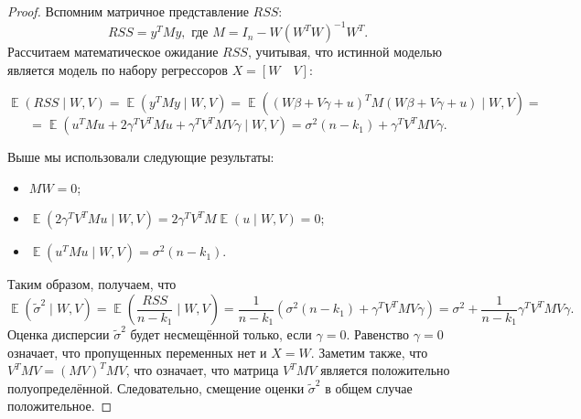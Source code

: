 \documentclass[12pt]{article}
\DeclareMathOperator{\Var}{\mathbb{V}ar}
\DeclareMathOperator{\E}{\mathbb{E}}
\renewcommand{\b}{\beta}
\newcommand{\hb}{\hat{\beta}}
\newcommand{\tb}{\tilde{\beta}}
\newcommand{\RSS}{RSS}
\begin{document}
\begin{proof}
Вспомним матричное представление $\RSS$:
\[
\RSS = y^{T}My, \text{ где } M = I_n - W(W^{T}W)^{-1}W^{T}.
\]
Рассчитаем математическое ожидание $\RSS$, учитывая, что истинной моделью является модель по набору регрессоров $X = [W \quad V]$:

\[
\E(\RSS \mid W,V) = \E(y^{T}My \mid W,V) = \E((W\b + V\gamma + u)^{T}M(W\b + V\gamma + u) \mid W,V) = 
\]
\[
=\E(u^{T}Mu + 2\gamma^{T}V^{T}Mu + \gamma^{T}V^{T}MV\gamma \mid W,V) = \sigma^2(n-k_1) + \gamma^{T}V^{T}MV\gamma.
\]

Выше мы использовали следующие результаты:
\begin{itemize}
    \item $MW = 0$;
    \item $\E(2\gamma^{T}V^{T}Mu \mid W,V) = 2\gamma^{T}V^{T}M\E(u \mid W,V) = 0$;
    \item  $\E (u^{T}Mu \mid W,V) = \sigma^2(n-k_1)$.
\end{itemize}

Таким образом, получаем, что 
\[
\E(\tilde\sigma^2 \mid W,V) = \E\left( \frac{RSS}{n-k_1}  \mid W,V\right) = \frac{1}{n-k_1} ( \sigma^2(n-k_1) + \gamma^{T}V^{T}MV\gamma ) = \sigma^2 + \frac{1}{n - k_1} \gamma^{T}V^{T}MV\gamma.
\]
Оценка дисперсии $\tilde\sigma^2$ будет несмещённой только, если $\gamma = 0$. 
Равенство $\gamma = 0$ означает, что пропущенных переменных нет и $X = W$.
Заметим также, что $V^{T}MV = (MV)^{T}MV$, что означает, что матрица $V^{T}MV$ является положительно полуопределённой. 
Следовательно, смещение оценки $\tilde\sigma^2$ в общем случае положительное.
\end{proof}
\begin{comment}
Что будет с эффективностью оценок, если пропущена часть важных регрессоров?
Ковариационная матрица оценок коэффициентов $\tilde{\b}$, полученная по сокращенному набору регрессоров $W$, имеет вид:
\[
\Var(\hb) = \sigma^2(X^{T}X)^{-1}.
\]

Вычислим ковариационную матрицу оценок коэффициентов $[\beta \,\,\,\, \gamma]^{T}$, полученную по полному набору регрессоров:
\[
\Var([\beta \,\,\,\, \gamma]^{T}) = \sigma^2([W \, V]^{T}[W \, V]).
\]

Применяя формулу блочного обращения матриц, получаем
\[
\Var(\tb) = \sigma^2 (W^{T}W - W^{T}V(V^{T}V)^{-1}V^{T}W)^{-1}.
\]

Рассмотрим разность двух ковариационных матриц:
\[
\Var(\hb) - \Var(\tb) = 
\]
\end{comment}
\end{document}
